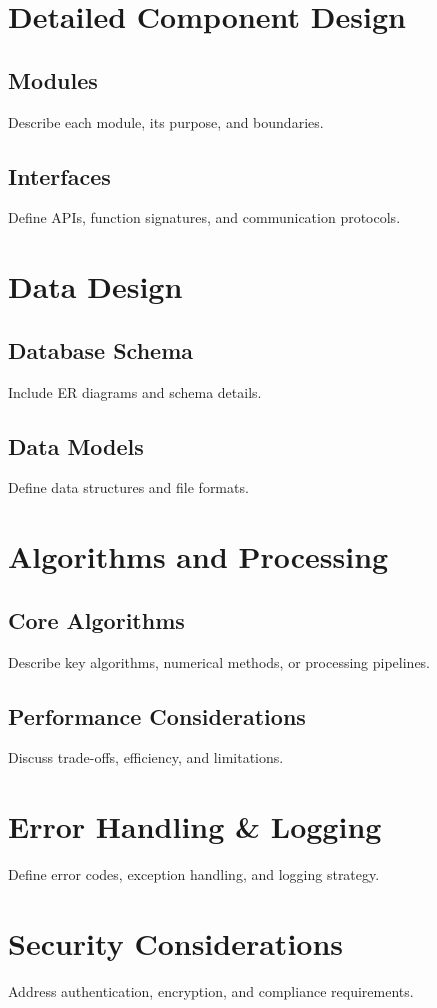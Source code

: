 \documentclass[12pt,a4paper]{article}
\begin{document}
	\section{Detailed Component Design}
	\subsection{Modules}
	Describe each module, its purpose, and boundaries.
	
	\subsection{Interfaces}
	Define APIs, function signatures, and communication protocols.
	
	\section{Data Design}
	\subsection{Database Schema}
	Include ER diagrams and schema details.
	
	\subsection{Data Models}
	Define data structures and file formats.
	
	\section{Algorithms and Processing}
	\subsection{Core Algorithms}
	Describe key algorithms, numerical methods, or processing pipelines.
	
	\subsection{Performance Considerations}
	Discuss trade-offs, efficiency, and limitations.
	
	\section{Error Handling \& Logging}
	Define error codes, exception handling, and logging strategy.
	
	\section{Security Considerations}
	Address authentication, encryption, and compliance requirements.
	
\end{document}
